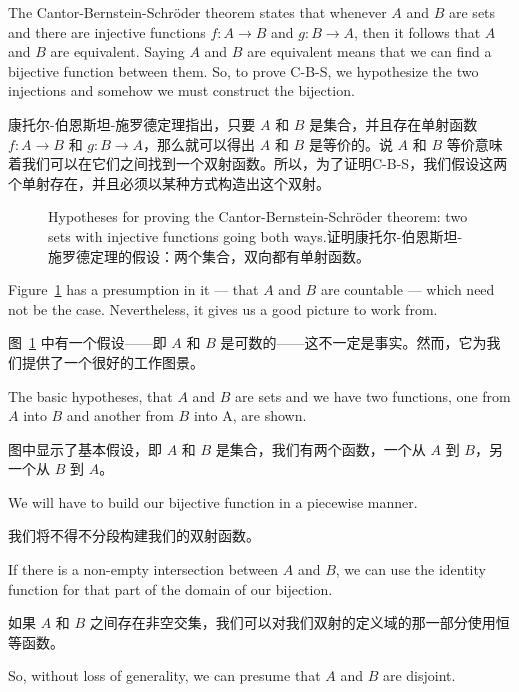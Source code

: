 The Cantor-Bernstein-Schr\"{o}der theorem states that
whenever $A$
and $B$ are sets and there are injective functions
$f : A \longrightarrow B$ and $g : B \longrightarrow A$,
then it follows that $A$ and $B$ are equivalent.  Saying $A$ and $B$
are equivalent
means that we can find a bijective function between them.  So, to prove
C-B-S, we hypothesize the two injections and somehow we must construct the
bijection.

康托尔-伯恩斯坦-施罗德定理指出，只要 $A$ 和 $B$ 是集合，并且存在单射函数 $f : A \longrightarrow B$ 和 $g : B \longrightarrow A$，那么就可以得出 $A$ 和 $B$ 是等价的。说 $A$ 和 $B$ 等价意味着我们可以在它们之间找到一个双射函数。所以，为了证明C-B-S，我们假设这两个单射存在，并且必须以某种方式构造出这个双射。

\begin{figure}[!hbtp]
    \begin{center}
        
    \end{center}
    \caption[Setup for proving the C-B-S theorem.证明C-B-S定理的设置。]{Hypotheses for %
    proving the Cantor-Bernstein-Schr\"{o}der theorem: %
    two sets with injective functions going both ways.证明康托尔-伯恩斯坦-施罗德定理的假设：两个集合，双向都有单射函数。}
    \label{fig:CBS_setup}
\end{figure}

Figure~\ref{fig:CBS_setup} has a presumption in it ---
that $A$ and $B$ are countable --- which
need not
be the case.  Nevertheless, it gives us a good picture to work from.

图~\ref{fig:CBS_setup} 中有一个假设——即 $A$ 和 $B$ 是可数的——这不一定是事实。然而，它为我们提供了一个很好的工作图景。

The basic hypotheses, that $A$ and $B$ are sets and we have two functions, one
from $A$ into $B$ and another from $B$ into A, are shown.

图中显示了基本假设，即 $A$ 和 $B$ 是集合，我们有两个函数，一个从 $A$ 到 $B$，另一个从 $B$ 到 $A$。

We will have to build our bijective function in a piecewise manner.

我们将不得不分段构建我们的双射函数。

If there is a non-empty intersection between $A$ and $B$, we can use the
identity function for that part of the domain of our bijection.

如果 $A$ 和 $B$ 之间存在非空交集，我们可以对我们双射的定义域的那一部分使用恒等函数。

So, without
loss of generality, we can presume that $A$ and $B$ are disjoint.

